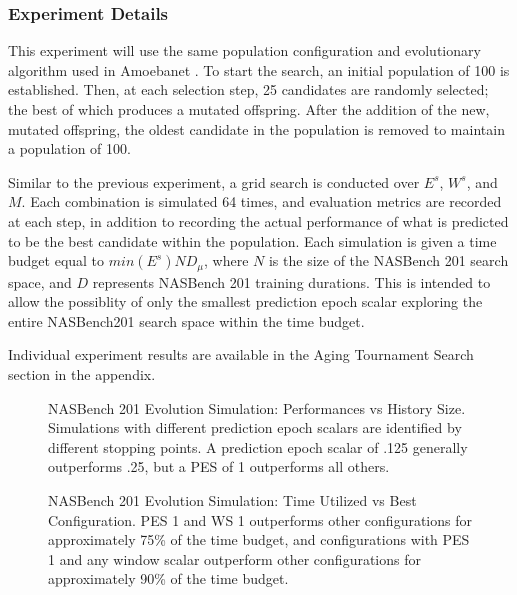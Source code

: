 \documentclass[twocolumn]{article}
\begin{document}
\subsubsection{Experiment Details}

This experiment will use the same population configuration and evolutionary algorithm used in Amoebanet \cite{amoebanet}.
To start the search, an initial population of 100 is established.
Then, at each selection step, 25 candidates are randomly selected; the best of which produces a mutated offspring.
After the addition of the new, mutated offspring, the oldest candidate in the population is removed to maintain a population of 100.

Similar to the previous experiment, a grid search is conducted over $E^s$, $W^s$, and $M$.
Each combination is simulated 64 times, and evaluation metrics are recorded at each step, in addition to recording the actual performance of what is predicted to be the
best candidate within the population.
Each simulation is given a time budget equal to $min(E^{s})ND_{\mu}$, where $N$ is the size of the NASBench 201 search space, and $D$ represents NASBench 201 training durations.
This is intended to allow the possiblity of only the smallest prediction epoch scalar exploring the entire NASBench201 search space within the time budget.

Individual experiment results are available in the Aging Tournament Search section in the appendix.

\begin{figure}[!t]
    \begin{center}
        \resizebox{\columnwidth}{!}{
            
        }
        \caption{NASBench 201 Evolution Simulation: Performances vs History Size.
        Simulations with different prediction epoch scalars are identified by different stopping points.
        A prediction epoch scalar of .125 generally outperforms .25, but a PES of 1 outperforms all others.}
        \label{fig:nasbench_best_perf_vs_size}
    \end{center}
\end{figure}

\begin{figure}[!ht]
    \begin{center}
        \resizebox{\columnwidth}{!}{
            
        }
        \caption{NASBench 201 Evolution Simulation: Time Utilized vs Best Configuration. 
        PES 1 and WS 1 outperforms other configurations for approximately 75\% of the time budget, 
        and configurations with PES 1 and any window scalar outperform other configurations for approximately 90\% of the time budget.}
        \label{fig:nasbench_best_perf_vs_slice}
    \end{center}
\end{figure}
\end{document}
